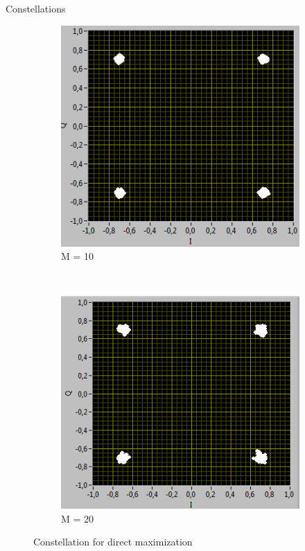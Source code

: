 \documentclass{beamer}
\begin{document}
\begin{frame}{Constellations}
\begin{figure}[h!]
	            \begin{subfigure}[b]{0.3 \textwidth}
	                \includegraphics[width=\textwidth]{dir_10.PNG}
	                \caption{M = 10}\label{fig:10}
	            \end{subfigure}
	            ~	           
	            \begin{subfigure}[b]{0.3 \textwidth}
	           \includegraphics[width=\textwidth]{dir_20.PNG}
	                \caption{M = 20}\label{fig:20}
	            \end{subfigure}
	            \caption{Constellation for direct maximization}\label{fig:const}
	        \end{figure}
	    \end{frame}
	    
\end{document}
